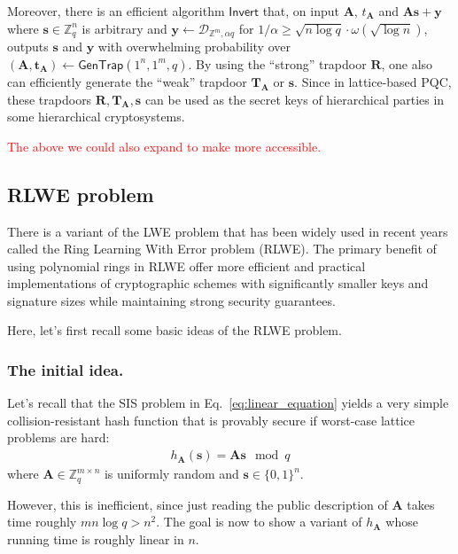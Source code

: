 \documentclass[cryptography,review,submit,pdftex,moreauthors,amsmath,amssymb,aps,strict]{Definitions/mdpi}
\newcommand{\peter}[1]{\textcolor{red}{#1}}
\begin{document}
Moreover, there is an efficient algorithm $\mathsf{Invert}$ that, on input $\mathbf{A}$, $t_{\mathbf{A}}$ and $\mathbf{A}\mathbf{s}+\mathbf{y}$ where $\mathbf{s}\in\mathbb{Z}^n_q$ is arbitrary and $\mathbf{y}\gets \mathcal{D}_{\mathbb{Z}^m,\alpha q}$ for $1/\alpha \geq \sqrt{n\log q}\cdot \omega(\sqrt{\log n})$, outputs $\mathbf{s}$ and $\mathbf{y}$ with overwhelming probability over $(\mathbf{A},\mathbf{t}_{\mathbf{A}})\gets \mathsf{GenTrap}(1^n,1^m,q)$. By using the ``strong'' trapdoor $\mathbf{R}$, one also can efficiently generate the ``weak'' trapdoor $\mathbf{T}_{\mathbf{A}}$ or $\mathbf{s}$. Since in lattice-based PQC, these trapdoors $\mathbf{R},\mathbf{T}_{\mathbf{A}}, \mathbf{s}$ can be used as the secret keys of hierarchical parties in some hierarchical cryptosystems.

\peter{The above we could also expand to make more accessible.}

\subsection{RLWE problem}

There is a variant of the LWE problem that has been widely used in recent years called the Ring Learning With Error problem (RLWE). The primary benefit of using polynomial rings in RLWE offer more efficient and practical implementations of cryptographic schemes with significantly smaller keys and signature sizes while maintaining strong security guarantees.

Here, let's first recall some basic ideas of the RLWE problem.

\subsubsection{The initial idea.}
Let's recall that the SIS problem in Eq.~\eqref{eq:linear_equation} yields a very simple collision-resistant hash function that is provably secure if worst-case lattice problems are hard:
\begin{align}
    h_{\mathbf{A}}(\mathbf{s})=\mathbf{A}\mathbf{s} \mod q
\end{align}
where $\mathbf{A}\in\mathbb{Z}^{m\times n}_q$ is uniformly random and $\mathbf{s}\in \{0,1\}^n$. 

However, this is inefficient, since just reading the public description of $\mathbf{A}$ takes time roughly $mn\log q>n^2$. The goal is now to show a variant of $h_{\mathbf{A}}$ whose running time is roughly linear in $n$. 
\end{document}
